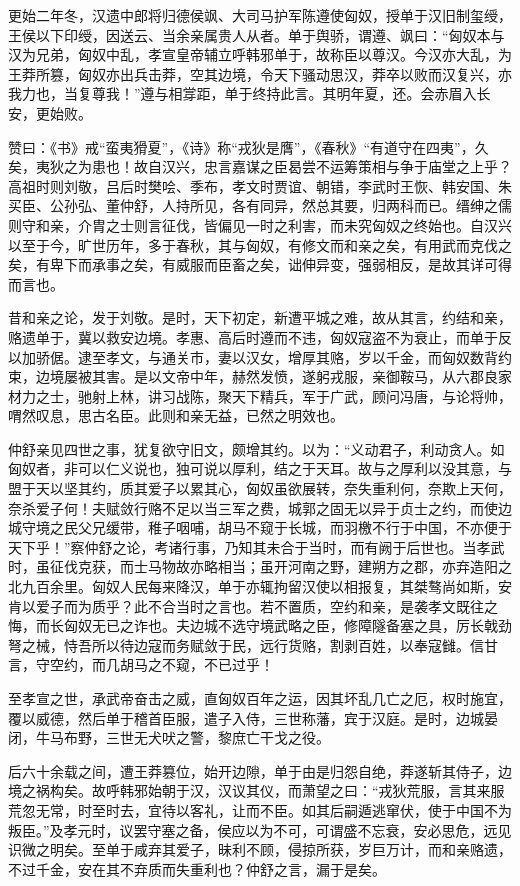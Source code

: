 \documentclass[]{article}
\begin{document}
更始二年冬，汉遗中郎将归德侯飒、大司马护军陈遵使匈奴，授单于汉旧制玺绶，王侯以下印绶，因送云、当余亲属贵人从者。单于舆骄，谓遵、飒曰：``匈奴本与汉为兄弟，匈奴中乱，孝宣皇帝辅立呼韩邪单于，故称臣以尊汉。今汉亦大乱，为王莽所篡，匈奴亦出兵击莽，空其边境，令天下骚动思汉，莽卒以败而汉复兴，亦我力也，当复尊我！''遵与相牚距，单于终持此言。其明年夏，还。会赤眉入长安，更始败。

赞曰：《书》戒``蛮夷猾夏''，《诗》称``戎狄是膺''，《春秋》``有道守在四夷''，久矣，夷狄之为患也！故自汉兴，忠言嘉谋之臣曷尝不运筹策相与争于庙堂之上乎？高祖时则刘敬，吕后时樊哙、季布，孝文时贾谊、朝错，李武时王恢、韩安国、朱买臣、公孙弘、董仲舒，人持所见，各有同异，然总其要，归两科而已。缙绅之儒则守和亲，介胄之士则言征伐，皆偏见一时之利害，而未究匈奴之终始也。自汉兴以至于今，旷世历年，多于春秋，其与匈奴，有修文而和亲之矣，有用武而克伐之矣，有卑下而承事之矣，有威服而臣畜之矣，诎伸异变，强弱相反，是故其详可得而言也。

昔和亲之论，发于刘敬。是时，天下初定，新遭平城之难，故从其言，约结和亲，赂遗单于，冀以救安边境。孝惠、高后时遵而不违，匈奴寇盗不为衰止，而单于反以加骄倨。逮至孝文，与通关市，妻以汉女，增厚其赂，岁以千金，而匈奴数背约束，边境屡被其害。是以文帝中年，赫然发愤，遂躬戎服，亲御鞍马，从六郡良家材力之士，驰射上林，讲习战陈，聚天下精兵，军于广武，顾问冯唐，与论将帅，喟然叹息，思古名臣。此则和亲无益，已然之明效也。

仲舒亲见四世之事，犹复欲守旧文，颇增其约。以为：``义动君子，利动贪人。如匈奴者，非可以仁义说也，独可说以厚利，结之于天耳。故与之厚利以没其意，与盟于天以坚其约，质其爱子以累其心，匈奴虽欲展转，奈失重利何，奈欺上天何，奈杀爱子何！夫赋敛行赂不足以当三军之费，城郭之固无以异于贞士之约，而使边城守境之民父兄缓带，稚子咽哺，胡马不窥于长城，而羽檄不行于中国，不亦便于天下乎！''察仲舒之论，考诸行事，乃知其未合于当时，而有阙于后世也。当孝武时，虽征伐克获，而士马物故亦略相当；虽开河南之野，建朔方之郡，亦弃造阳之北九百余里。匈奴人民每来降汉，单于亦辄拘留汉使以相报复，其桀骜尚如斯，安肯以爱子而为质乎？此不合当时之言也。若不置质，空约和亲，是袭孝文既往之悔，而长匈奴无已之诈也。夫边城不选守境武略之臣，修障隧备塞之具，厉长戟劲弩之械，恃吾所以待边寇而务赋敛于民，远行货赂，割剥百姓，以奉寇雠。信甘言，守空约，而几胡马之不窥，不已过乎！

至孝宣之世，承武帝奋击之威，直匈奴百年之运，因其坏乱几亡之厄，权时施宜，覆以威德，然后单于稽首臣服，遣子入侍，三世称藩，宾于汉庭。是时，边城晏闭，牛马布野，三世无犬吠之警，黎庶亡干戈之役。

后六十余载之间，遭王莽篡位，始开边隙，单于由是归怨自绝，莽遂斩其侍子，边境之祸构矣。故呼韩邪始朝于汉，汉议其仪，而萧望之曰：``戎狄荒服，言其来服荒忽无常，时至时去，宜待以客礼，让而不臣。如其后嗣遁逃窜伏，使于中国不为叛臣。''及孝元时，议罢守塞之备，侯应以为不可，可谓盛不忘衰，安必思危，远见识微之明矣。至单于咸弃其爱子，昧利不顾，侵掠所获，岁巨万计，而和亲赂遗，不过千金，安在其不弃质而失重利也？仲舒之言，漏于是矣。
\end{document}
